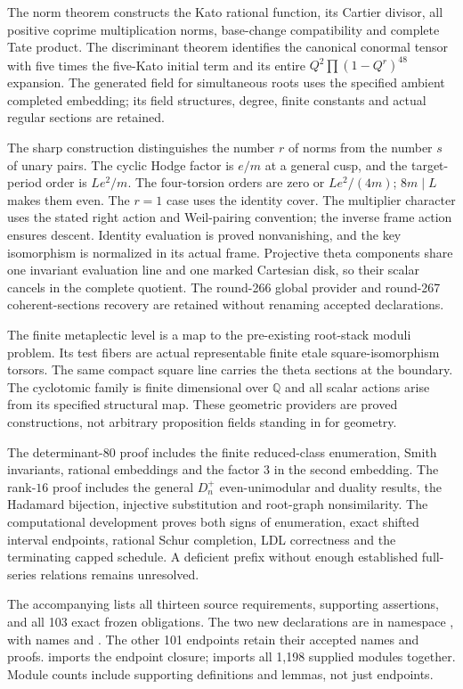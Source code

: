 \documentclass[11pt]{article}
\theoremstyle{remark}\newtheorem{remark}[theorem]{Remark}
\begin{document}
The norm theorem constructs the Kato rational function, its Cartier divisor,
all positive coprime multiplication norms, base-change compatibility and
complete Tate product. The discriminant theorem identifies the canonical
conormal tensor with five times the five-Kato initial term and its entire
$Q^2\prod(1-Q^r)^{48}$ expansion. The generated field for simultaneous roots
uses the specified ambient completed embedding; its field structures, degree,
finite constants and actual regular sections are retained.

The sharp construction distinguishes the number $r$ of norms from the number
$s$ of unary pairs. The cyclic Hodge factor is $e/m$ at a general cusp, and
the target-period order is $Le^2/m$. The four-torsion orders are zero or
$Le^2/(4m)$; $8m\mid L$ makes them even. The $r=1$ case uses the identity
cover. The multiplier character uses the stated right action and Weil-pairing
convention; the inverse frame action ensures descent. Identity evaluation
is proved nonvanishing, and the key isomorphism is normalized in its actual
frame. Projective theta components share one invariant evaluation line and
one marked Cartesian disk, so their scalar cancels in the complete quotient.
The round-266 global provider and round-267 coherent-sections recovery are
retained without renaming accepted declarations.

The finite metaplectic level is a map to the pre-existing root-stack moduli
problem. Its test fibers are actual representable finite etale square-isomorphism
torsors. The same compact square line carries the theta sections at the boundary.
The cyclotomic family is finite dimensional over $\mathbb Q$ and all scalar
actions arise from its specified structural map. These geometric providers are
proved constructions, not arbitrary proposition fields standing in for geometry.

The determinant-$80$ proof includes the finite reduced-class enumeration,
Smith invariants, rational embeddings and the factor $3$ in the second
embedding. The rank-$16$ proof includes the general $D_n^+$ even-unimodular
and duality results, the Hadamard bijection, injective substitution and
root-graph nonsimilarity. The computational development proves both signs
of enumeration, exact shifted interval endpoints, rational Schur completion,
LDL correctness and the terminating capped schedule. A deficient prefix
without enough established full-series relations remains unresolved.

The accompanying  lists all thirteen source
requirements, supporting assertions, and all 103 exact frozen obligations.
The two new declarations are in namespace
, with names
 and .
The other 101 endpoints retain their accepted names and proofs.
 imports the endpoint closure;
 imports all 1,198 supplied modules together.
Module counts include supporting definitions and lemmas, not just endpoints.
\end{document}

